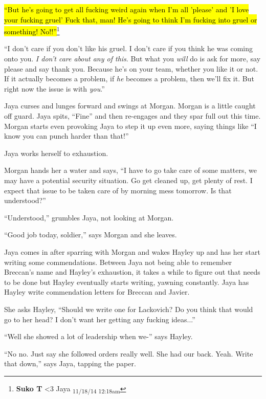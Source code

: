 \hl{``But he's going to get all fucking weird again when I'm all 'please' and 'I love your fucking gruel'  Fuck that, man!  He's going to think I'm fucking into gruel or something!  No!!''}\footnote{\textbf{Suko T }\textless 3 Jaya \textsubscript{11/18/14 12:18am}}

``I don't care if you don't like his gruel.  I don't care if you think he was coming onto you.  \textit{I don't care about any of this}.  But what you \textit{will} do is ask for more, say please and say thank you.  Because he's on your team, whether you like it or not.  If it actually becomes a problem, if \textit{he} becomes a problem, then we'll fix it.  But right now the issue is with \textit{you}.''

Jaya curses and lunges forward and swings at Morgan.  Morgan is a little caught off guard.  Jaya spits, ``Fine'' and then re-engages and they spar full out this time.  Morgan starts even provoking Jaya to step it up even more, saying things like ``I know you can punch harder than that!''

Jaya works herself to exhaustion.  



Morgan hands her a water and says, ``I have to go take care of some matters, we may have a potential security situation.  Go get cleaned up, get plenty of rest.  I expect that issue to be taken care of by morning mess tomorrow.  Is that understood?''

``Understood,'' grumbles Jaya, not looking at Morgan.

``Good job today, soldier,'' says Morgan and she leaves.





Jaya comes in after sparring with Morgan and wakes Hayley up and has her start writing some commendations.  Between Jaya not being able to remember Breccan's name and Hayley's exhaustion, it takes a while to figure out that needs to be done but Hayley eventually starts writing, yawning constantly.  Jaya has Hayley write commendation letters for Breccan and Javier.

She asks Hayley, ``Should we write one for Lackovich?  Do you think that would go to her head?  I don't want her getting any fucking ideas...''

``Well she showed a lot of leadership when we-'' says Hayley.

``No no.  Just say she followed orders really well.  She had our back.  Yeah. Write that down,'' says Jaya, tapping the paper.

